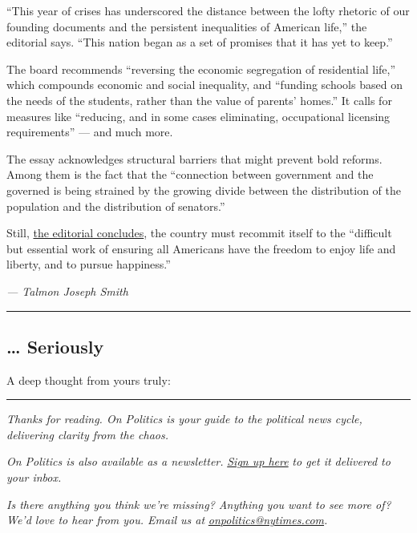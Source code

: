 ``This year of crises has underscored the distance between the lofty
rhetoric of our founding documents and the persistent inequalities of
American life,'' the editorial says. ``This nation began as a set of
promises that it has yet to keep.''

The board recommends ``reversing the economic segregation of residential
life,'' which compounds economic and social inequality, and ``funding
schools based on the needs of the students, rather than the value of
parents' homes.'' It calls for measures like ``reducing, and in some
cases eliminating, occupational licensing requirements'' --- and much
more.

The essay acknowledges structural barriers that might prevent bold
reforms. Among them is the fact that the ``connection between government
and the governed is being strained by the growing divide between the
distribution of the population and the distribution of senators.''

Still,
\href{https://www.nytimes.com/2020/07/02/opinion/income-inequality-solutions.html}{the
editorial concludes}, the country must recommit itself to the
``difficult but essential work of ensuring all Americans have the
freedom to enjoy life and liberty, and to pursue happiness.''

\emph{--- Talmon Joseph Smith}

\begin{center}\rule{0.5\linewidth}{\linethickness}\end{center}

\hypertarget{-seriously}{%
\subsection{\ldots{} Seriously}\label{-seriously}}

A deep thought from yours truly:

\begin{center}\rule{0.5\linewidth}{\linethickness}\end{center}

\emph{Thanks for reading. On Politics is your guide to the political
news cycle, delivering clarity from the chaos.}

\emph{On Politics is also available as a newsletter.}
\href{https://www.nytimes.com/newsletters/politics}{\emph{Sign up here}}
\emph{to get it delivered to your inbox.}

\emph{Is there anything you think we're missing? Anything you want to
see more of? We'd love to hear from you. Email us at}
\href{mailto:onpolitics@nytimes.com}{\emph{onpolitics@nytimes.com}}\emph{.}

